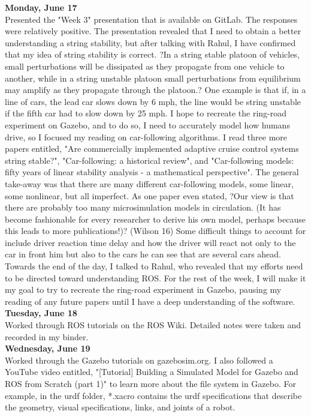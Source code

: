 \documentclass[12pt, letterpaper]{article}
\begin{document}
{\bf Monday, June 17} \\
Presented the "Week 3" presentation that is available on GitLab. The responses were relatively positive. The presentation revealed that I need to obtain a better understanding a string stability, but after talking with Rahul, I have confirmed that my idea of string stability is correct. ?In a string stable platoon of vehicles, small perturbations will be dissipated as they propagate from one vehicle to another, while in a string unstable platoon small perturbations from equilibrium may amplify as they propagate through the platoon.? One example is that if, in a line of cars, the lead car slows down by 6 mph, the line would be string unstable if the fifth car had to slow down by 25 mph. I hope to recreate the ring-road experiment on Gazebo, and to do so, I need to accurately model how humans drive, so I focused my reading on car-following algorithms. I read three more papers entitled, "Are commercially implemented adaptive cruise control systems string stable?", "Car-following: a historical review", and "Car-following models: fifty years of linear stability analysis - a mathematical perspective". The general take-away was that there are many different car-following models, some linear, some nonlinear, but all imperfect. As one paper even stated, ?Our view is that there are probably too many microsimulation models in circulation. (It has become fashionable for every researcher to derive his own model, perhaps because this leads to more publications!)? (Wilson 16) Some difficult things to account for include driver reaction time delay and how the driver will react not only to the car in front him but also to the cars he can see that are several cars ahead. Towards the end of the day, I talked to Rahul, who revealed that my efforts need to be directed toward understanding ROS. For the rest of the week, I will make it my goal to try to recreate the ring-road experiment in Gazebo, pausing my reading of any future papers until I have a deep understanding of the software.\\

{\bf Tuesday, June 18}\\
Worked through ROS tutorials on the ROS Wiki. Detailed notes were taken and recorded in my binder.\\

{\bf Wednesday, June 19}\\
Worked through the Gazebo tutorials on gazebosim.org. I also followed a YouTube video entitled, "[Tutorial] Building a Simulated Model for Gazebo and ROS from Scratch (part 1)" to learn more about the file system in Gazebo. For example, in the urdf folder, *.xacro contains the urdf specifications that describe the geometry, visual specifications, links, and joints of a robot.\\
\end{document}
